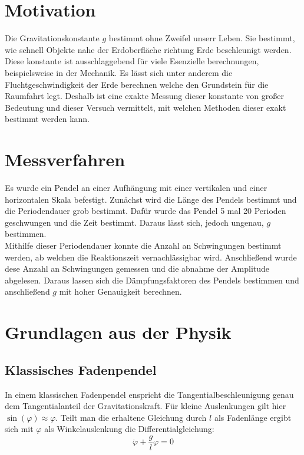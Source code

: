 \section{Motivation}

Die Gravitationskonstante $g$ bestimmt ohne Zweifel unserr Leben.
Sie bestimmt, wie schnell Objekte nahe der Erdoberfläche richtung Erde beschleunigt werden.
Diese konstante ist ausschlaggebend für viele Esenzielle berechnungen, beispielsweise in der Mechanik.
Es lässt sich unter anderem die Fluchtgeschwindigkeit der Erde berechnen welche den Grundstein für
die Raumfahrt legt. Deshalb ist eine exakte Messung dieser konstante von großer Bedeutung und dieser Versuch
vermittelt, mit welchen Methoden dieser exakt bestimmt werden kann.


\section{Messverfahren}
Es wurde ein Pendel an einer Aufhängung mit einer vertikalen und einer horizontalen Skala befestigt.
Zunächst wird die Länge des Pendels bestimmt und die Periodendauer grob bestimmt.
Dafür wurde das Pendel 5 mal 20 Perioden geschwungen und die Zeit bestimmt.
Daraus lässt sich, jedoch ungenau, $g$ bestimmen.\\
Mithilfe dieser Periodendauer konnte die Anzahl an Schwingungen bestimmt werden,
ab welchen die Reaktionszeit vernachlässigbar wird.
Anschließend wurde dese Anzahl an Schwingungen gemessen und die abnahme der Amplitude abgelesen.
Daraus lassen sich die Dämpfungsfaktoren des Pendels bestimmen und anschließend $g$ mit hoher Genauigkeit berechnen.

\section{Grundlagen aus der Physik}

\subsection{Klassisches Fadenpendel}
In einem klassischen Fadenpendel enspricht die Tangentialbeschleunigung genau dem Tangentialanteil der Gravitationskraft.
Für kleine Auslenkungen gilt hier $\sin(\varphi) \approx \varphi$.
Teilt man die erhaltene Gleichung durch $l$ als Fadenlänge ergibt sich mit $\varphi$ als Winkelauslenkung die Differentialgleichung:
\begin{equation}
    \ddot{\varphi} + \frac{g}{l} \varphi = 0
    \label{eq:ho}
\end{equation}

